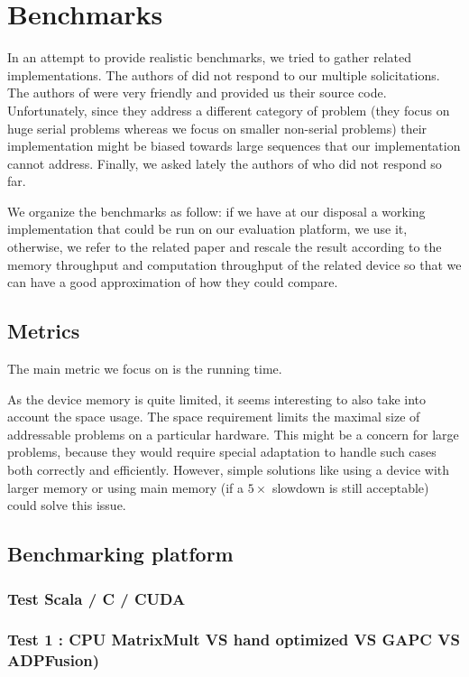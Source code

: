 \documentclass[11pt]{article}
\begin{document}
\section{Benchmarks} \label{benchmarks}
In an attempt to provide realistic benchmarks, we tried to gather related implementations. The authors of \cite{gpu_atlp} did not respond to our multiple solicitations. The authors of \cite{swat_mega} were very friendly and provided us their source code. Unfortunately, since they address a different category of problem (they focus on huge serial problems whereas we focus on smaller non-serial problems) their implementation might be biased towards large sequences that our implementation cannot address. Finally, we asked lately the authors of \cite{gpu_rnafold} {\color{red} who did not respond so far}.

We organize the benchmarks as follow: if we have at our disposal a working implementation that could be run on our evaluation platform, we use it, otherwise, we refer to the related paper and rescale the result according to the memory throughput and computation throughput of the related device so that we can have a good approximation of how they could compare.

\subsection{Metrics}
{\color{red} The main metric we focus on is the running time.}

As the device memory is quite limited, it seems interesting to also take into account the space usage. The space requirement limits the maximal size of addressable problems  on a particular hardware. This might be a concern for large problems, because they would require special adaptation to handle such cases both correctly and efficiently. However, simple solutions like using a device with larger memory or using main memory (if a $5\times$ slowdown is still acceptable) could solve this issue.

\subsection{Benchmarking platform}

\subsubsection{Test Scala / C / CUDA}
\subsubsection{Test 1 : CPU MatrixMult VS hand optimized VS GAPC VS ADPFusion)}
\end{document}
